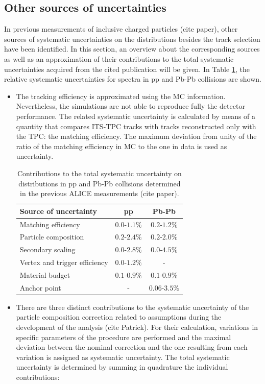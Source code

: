\documentclass[12pt,a4paper]{report}
\begin{document}
\subsection{Other sources of uncertainties} 
In previous measurements of inclusive charged particles (cite paper), other sources of systematic uncertainties on the \pt distributions besides the track selection have been identified. In this section, an overview about the corresponding sources as well as an approximation of their contributions to the total systematic uncertainties acquired from the cited publication will be given. In Table \ref{tab:othersources}, the relative systematic uncertainties for \pt spectra in pp and Pb-Pb collisions are shown. 
\begin{itemize}
\item The tracking efficiency is approximated using the MC information. Nevertheless, the simulations are not able  to reproduce fully the detector performance. The related systematic uncertainty is calculated by means of a quantity that compares ITS-TPC tracks with tracks reconstructed only with the TPC: the matching efficiency. The maximum deviation from unity of the ratio of the matching efficiency in MC to the one in data is used as uncertainty.
\begin{table}[tb!]
\renewcommand{\arraystretch}{1.5}
\centering
\begin{tabular}{l c c}
\toprule
\rowcolor{headerBlue}  \textbf{Source of uncertainty} &  \textbf{pp}  &   \textbf{Pb-Pb}  \\
\midrule
\midrule
Matching efficiency & $0.0$-$1.1\%$  & $0.2$-$1.2\%$\\
Particle composition & $0.2$-$2.4\%$ & $0.2$-$2.0\%$\\
Secondary scaling & $0.0$-$2.8\%$ & $0.0$-$4.5\%$ \\
Vertex and trigger efficiency & $0.0$-$1.2\%$ & - \\
Material budget & $0.1$-$0.9\%$ & $0.1$-$0.9\%$ \\
Anchor point & - & $0.06$-$3.5\%$ \\
\bottomrule
\end{tabular}
\caption{Contributions to the total systematic uncertainty on \pt distributions in pp and Pb-Pb collisions determined in the previous ALICE measurements (cite paper).}
\label{tab:othersources}
\end{table}
\item There are three distinct contributions to the systematic uncertainty of the particle composition correction related to assumptions during the development of the analysis (cite Patrick). For their calculation, variations in specific parameters of the procedure are performed and the maximal deviation between the nominal correction and the one resulting from each variation is assigned as systematic uncertainty. The total systematic uncertainty is determined by summing in quadrature the individual contributions:

\end{itemize}
\end{document}
